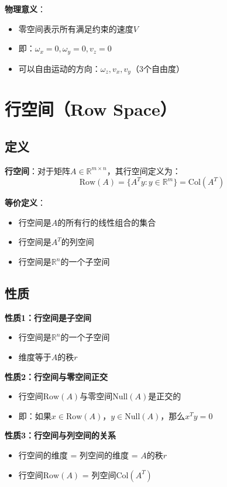 \documentclass[12pt,a4paper]{article}
\begin{document}
\textbf{物理意义}：
\begin{itemize}
\item 零空间表示所有满足约束的速度$V$
\item 即：$\omega_x = 0, \omega_y = 0, v_z = 0$
\item 可以自由运动的方向：$\omega_z, v_x, v_y$（3个自由度）
\end{itemize}

\section{行空间（Row Space）}

\subsection{定义}

\textbf{行空间}：对于矩阵$A \in \mathbb{R}^{m \times n}$，其行空间定义为：
\begin{equation}
\text{Row}(A) = \{A^T y : y \in \mathbb{R}^m\} = \text{Col}(A^T)
\end{equation}

\textbf{等价定义}：
\begin{itemize}
\item 行空间是$A$的所有行的线性组合的集合
\item 行空间是$A^T$的列空间
\item 行空间是$\mathbb{R}^n$的一个子空间
\end{itemize}

\subsection{性质}

\textbf{性质1：行空间是子空间}
\begin{itemize}
\item 行空间是$\mathbb{R}^n$的一个子空间
\item 维度等于$A$的秩$r$
\end{itemize}

\textbf{性质2：行空间与零空间正交}
\begin{itemize}
\item 行空间$\text{Row}(A)$与零空间$\text{Null}(A)$是正交的
\item 即：如果$x \in \text{Row}(A)$，$y \in \text{Null}(A)$，那么$x^T y = 0$
\end{itemize}

\textbf{性质3：行空间与列空间的关系}
\begin{itemize}
\item 行空间的维度 = 列空间的维度 = $A$的秩$r$
\item 行空间$\text{Row}(A)$ = 列空间$\text{Col}(A^T)$
\end{itemize}
\end{document}
